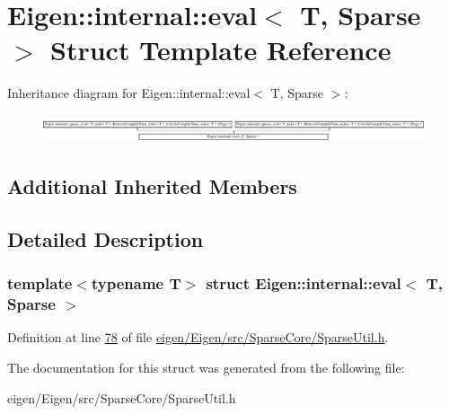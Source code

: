 \hypertarget{struct_eigen_1_1internal_1_1eval_3_01_t_00_01_sparse_01_4}{}\section{Eigen\+:\+:internal\+:\+:eval$<$ T, Sparse $>$ Struct Template Reference}
\label{struct_eigen_1_1internal_1_1eval_3_01_t_00_01_sparse_01_4}
Inheritance diagram for Eigen\+:\+:internal\+:\+:eval$<$ T, Sparse $>$\+:\begin{figure}[H]
\begin{center}
\leavevmode
\includegraphics[height=0.827179cm]{struct_eigen_1_1internal_1_1eval_3_01_t_00_01_sparse_01_4}
\end{center}
\end{figure}
\subsection*{Additional Inherited Members}


\subsection{Detailed Description}
\subsubsection*{template$<$typename T$>$\newline
struct Eigen\+::internal\+::eval$<$ T, Sparse $>$}



Definition at line \hyperlink{eigen_2_eigen_2src_2_sparse_core_2_sparse_util_8h_source_l00078}{78} of file \hyperlink{eigen_2_eigen_2src_2_sparse_core_2_sparse_util_8h_source}{eigen/\+Eigen/src/\+Sparse\+Core/\+Sparse\+Util.\+h}.



The documentation for this struct was generated from the following file\+:\begin{DoxyCompactItemize}
\item 
eigen/\+Eigen/src/\+Sparse\+Core/\+Sparse\+Util.\+h\end{DoxyCompactItemize}
